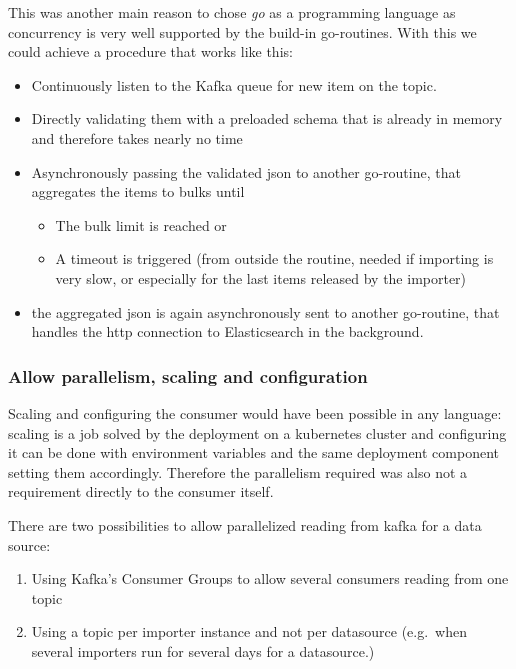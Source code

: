This was another main reason to chose \emph{go} as a programming
language as concurrency is very well supported by the build-in
go-routines. With this we could achieve a procedure that works like
this:

\begin{itemize}
\item
  Continuously listen to the Kafka queue for new item on the topic.
\item
  Directly validating them with a preloaded schema that is already in
  memory and therefore takes nearly no time
\item
  Asynchronously passing the validated json to another go-routine, that
  aggregates the items to bulks until

  \begin{itemize}
  \item
    The bulk limit is reached or
  \item
    A timeout is triggered (from outside the routine, needed if
    importing is very slow, or especially for the last items released by
    the importer)
  \end{itemize}
\item
  the aggregated json is again asynchronously sent to another
  go-routine, that handles the http connection to Elasticsearch in the
  background.
\end{itemize}

\subsubsection{Allow parallelism, scaling and
configuration}\label{allow-parallelism-scaling-and-configuration}

Scaling and configuring the consumer would have been possible in any
language: scaling is a job solved by the deployment on a kubernetes
cluster and configuring it can be done with environment variables and
the same deployment component setting them accordingly. Therefore the
parallelism required was also not a requirement directly to the consumer
itself.

There are two possibilities to allow parallelized reading from kafka for
a data source:

\begin{enumerate}
\def\labelenumi{\arabic{enumi}.}
\item
  Using Kafka's Consumer Groups to allow several consumers reading from
  one topic
\item
  Using a topic per importer instance and not per datasource (e.g.~when
  several importers run for several days for a datasource.)
\end{enumerate}

